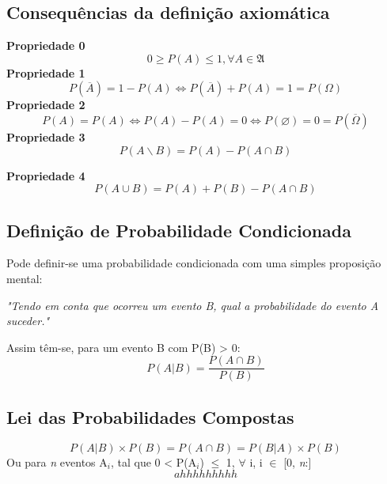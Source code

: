 \documentclass[a4paper,12pt]{article}
\let\empty\varnothing
\let\eqv\Longleftrightarrow
\begin{document}
		\subsection{Consequências da definição axiomática}
		\begin{center}
			{\bfseries Propriedade 0}
			\begin{equation}
				0 \geq P(A) \leq 1 , \forall A \in \mathfrak{A}
			\end{equation}
			{\bfseries Propriedade 1}
			\begin{equation}
				P(\overline{A})=1-P(A) \eqv P(\overline{A})+P(A)=1 = P(\Omega) 
			\end{equation}
			{\bfseries Propriedade 2}
                          \begin{equation}
                                  P(A)=P(A) \eqv P(A)-P(A)=0 \eqv P(\empty)=0=P(\overline{\Omega}) 
                          \end{equation}
			{\bfseries Propriedade 3}
                        \begin{equation}
                                  P(A\backslash B) = P(A)-P(A \cap B)
                        \end{equation}
			                             
                        {\bfseries Propriedade 4}
                          \begin{equation}
                                  P(A\cup B)= P(A)+P(B)-P(A\cap B)
                          \end{equation}
		\end{center}
		\subsection{Definição de Probabilidade Condicionada}
			Pode definir-se uma probabilidade condicionada com uma simples proposição mental:
			\begin{center}
				\textit{"Tendo em conta que ocorreu um evento B, qual a probabilidade do evento A suceder."}
			\end{center}
			Assim têm-se, para um evento B com P(B) > 0:
			\begin{equation}
				P(A|B)=\frac{P(A \cap B)}{P(B)}
			\end{equation}
			\subsection{Lei das Probabilidades Compostas}
				\begin{equation}
                                	P(A|B) \times P(B) = P(A \cap B) = P(B|A) \times P(B)
				\end{equation}
	Ou para \textit{n} eventos A$_i$, tal que 0 < P(A$_i$) $\leq$ 1, $\forall$ i, i $\in$ [0, \textit{n}:] 
				\begin{equation}
                			ahhhhhhhhh
                                \end{equation}
\end{document}
